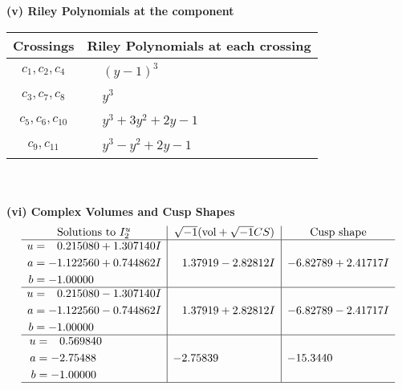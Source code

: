 \documentclass[1p]{elsarticle_modified}
\theoremstyle{definition}
\newcommand{\I}{\sqrt{-1}}
\begin{document}
\flushleft \textbf{(v) Riley Polynomials at the component}\newline \\
\begin{tabular}{m{50pt}|m{274pt}}
Crossings & \hspace{64pt}Riley Polynomials at each crossing \\
\hline $$\begin{aligned}c_{1},c_{2},c_{4}\end{aligned}$$&$\begin{aligned}
&(y-1)^3
\end{aligned}$\\
\hline $$\begin{aligned}c_{3},c_{7},c_{8}\end{aligned}$$&$\begin{aligned}
&y^3
\end{aligned}$\\
\hline $$\begin{aligned}c_{5},c_{6},c_{10}\end{aligned}$$&$\begin{aligned}
&y^3+3 y^2+2 y-1
\end{aligned}$\\
\hline $$\begin{aligned}c_{9},c_{11}\end{aligned}$$&$\begin{aligned}
&y^3- y^2+2 y-1
\end{aligned}$\\
\hline
\end{tabular}\\~\\
\newpage\flushleft \textbf{(vi) Complex Volumes and Cusp Shapes}
$$\begin{array}{c|c|c}  
\text{Solutions to }I^u_{2}& \I (\text{vol} + \sqrt{-1}CS) & \text{Cusp shape}\\
 \hline 
\begin{aligned}
u &= \phantom{-}0.215080 + 1.307140 I \\
a &= -1.122560 + 0.744862 I \\
b &= -1.00000\phantom{ +0.000000I}\end{aligned}
 & \phantom{-}1.37919 - 2.82812 I & -6.82789 + 2.41717 I \\ \hline\begin{aligned}
u &= \phantom{-}0.215080 - 1.307140 I \\
a &= -1.122560 - 0.744862 I \\
b &= -1.00000\phantom{ +0.000000I}\end{aligned}
 & \phantom{-}1.37919 + 2.82812 I & -6.82789 - 2.41717 I \\ \hline\begin{aligned}
u &= \phantom{-}0.569840\phantom{ +0.000000I} \\
a &= -2.75488\phantom{ +0.000000I} \\
b &= -1.00000\phantom{ +0.000000I}\end{aligned}
 & -2.75839\phantom{ +0.000000I} & -15.3440\phantom{ +0.000000I}\\
 \hline 
 \end{array}$$\newpage
\end{document}
